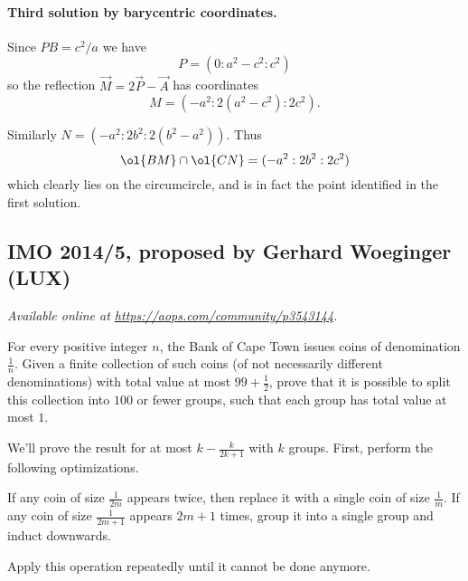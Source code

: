 \documentclass[11pt]{scrartcl}
\begin{document}
\paragraph{Third solution by barycentric coordinates.}
Since $PB = c^2/a$ we have
\[ P = (0 : a^2-c^2 : c^2) \]
so the reflection $\vec M = 2\vec P - \vec A$ has coordinates
\[ M = (-a^2 : 2(a^2-c^2) : 2c^2). \]

Similarly $N = (-a^2 : 2b^2 : 2(b^2-a^2))$. Thus
\[ \ol{BM} \cap \ol{CN} = (-a^2 : 2b^2 : 2c^2) \]
which clearly lies on the circumcircle,
and is in fact the point identified in the first solution.
\pagebreak

\subsection{IMO 2014/5, proposed by Gerhard Woeginger (LUX)}
\textsl{Available online at \url{https://aops.com/community/p3543144}.}
\begin{mdframed}[style=mdpurplebox,frametitle={Problem statement}]
For every positive integer $n$,
the Bank of Cape Town issues coins of denomination $\frac 1n$.
Given a finite collection of such coins (of not necessarily different denominations)
with total value at most $99 + \frac12$, prove that it is possible to split
this collection into $100$ or fewer groups, such that each group has total value at most $1$.
\end{mdframed}
We'll prove the result
for at most $k - \frac{k}{2k+1}$ with $k$ groups.
First, perform the following optimizations.
\begin{itemize}
  \ii If any coin of size $\frac{1}{2m}$ appears twice,
  then replace it with a single coin of size $\frac{1}{m}$.
  \ii If any coin of size $\frac{1}{2m+1}$ appears $2m+1$ times,
  group it into a single group and induct downwards.
\end{itemize}
Apply this operation repeatedly until it cannot be done anymore.
\end{document}
